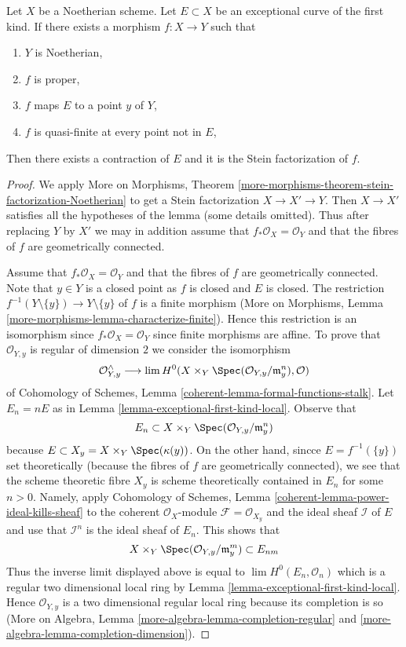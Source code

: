 \begin{lemma}
\label{lemma-contraction}
Let $X$ be a Noetherian scheme. Let $E \subset X$ be an
exceptional curve of the first kind. If there exists a morphism
$f : X \to Y$ such that
\begin{enumerate}
\item $Y$ is Noetherian,
\item $f$ is proper,
\item $f$ maps $E$ to a point $y$ of $Y$,
\item $f$ is quasi-finite at every point not in $E$,
\end{enumerate}
Then there exists a contraction of $E$ and it is the Stein
factorization of $f$.
\end{lemma}

\begin{proof}
We apply More on Morphisms, Theorem
\ref{more-morphisms-theorem-stein-factorization-Noetherian}
to get a Stein factorization $X \to X' \to Y$.
Then $X \to X'$ satisfies all the hypotheses of
the lemma (some details omitted).
Thus after replacing $Y$ by $X'$ we may in addition
assume that $f_*\mathcal{O}_X = \mathcal{O}_Y$ and
that the fibres of $f$ are geometrically connected.

\medskip\noindent
Assume that $f_*\mathcal{O}_X = \mathcal{O}_Y$ and
that the fibres of $f$ are geometrically connected.
Note that $y \in Y$ is a closed point as $f$ is closed and $E$ is closed.
The restriction $f^{-1}(Y \setminus \{y\}) \to Y \setminus \{y\}$
of $f$ is a finite morphism
(More on Morphisms, Lemma \ref{more-morphisms-lemma-characterize-finite}).
Hence this restriction is an isomorphism since
$f_*\mathcal{O}_X = \mathcal{O}_Y$ since finite morphisms are affine.
To prove that $\mathcal{O}_{Y, y}$ is regular of dimension
$2$ we consider the isomorphism
$$
\mathcal{O}_{Y, y}^\wedge \longrightarrow
\lim H^0(X \times_Y \Spec(\mathcal{O}_{Y, y}/\mathfrak m_y^n), \mathcal{O})
$$
of Cohomology of Schemes, Lemma \ref{coherent-lemma-formal-functions-stalk}.
Let $E_n = nE$ as in Lemma \ref{lemma-exceptional-first-kind-local}.
Observe that
$$
E_n \subset X \times_Y \Spec(\mathcal{O}_{Y, y}/\mathfrak m_y^n)
$$
because $E \subset X_y = X \times_Y \Spec(\kappa(y))$.
On the other hand, sincce $E = f^{-1}(\{y\})$ set theoretically
(because the fibres of $f$ are geometrically connected), we see that
the scheme theoretic fibre $X_y$ is scheme theoretically contained in
$E_n$ for some $n > 0$. Namely, apply
Cohomology of Schemes, Lemma \ref{coherent-lemma-power-ideal-kills-sheaf}
to the coherent $\mathcal{O}_X$-module $\mathcal{F} = \mathcal{O}_{X_y}$
and the ideal sheaf $\mathcal{I}$ of $E$ and use that
$\mathcal{I}^n$ is the ideal sheaf of $E_n$. This shows that
$$
X \times_Y \Spec(\mathcal{O}_{Y, y}/\mathfrak m_y^m) \subset E_{nm}
$$
Thus the inverse limit displayed above is equal to
$\lim H^0(E_n, \mathcal{O}_n)$
which is a regular two dimensional local ring by
Lemma \ref{lemma-exceptional-first-kind-local}.
Hence $\mathcal{O}_{Y, y}$ is a two dimensional regular local
ring because its completion is so
(More on Algebra, Lemma \ref{more-algebra-lemma-completion-regular} and
\ref{more-algebra-lemma-completion-dimension}).


\end{proof}
